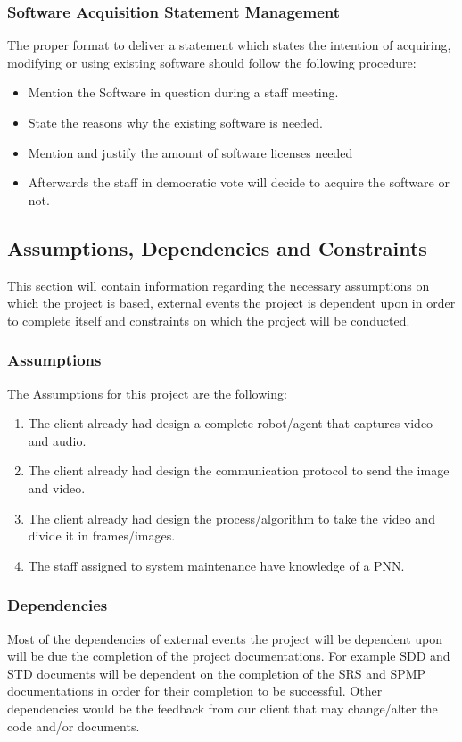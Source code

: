\documentclass[12pt]{article}
\begin{document}
\subsubsection{Software Acquisition Statement Management}
The proper format to deliver a statement which states the intention of acquiring, modifying or using existing software should follow the following procedure:

\begin{itemize}
  \item	Mention the Software in question during a staff meeting.
  \item State the reasons why the existing software is needed.
  \item Mention and justify the amount of software licenses needed
  \item Afterwards the staff in democratic vote will decide to acquire the software or not.
\end{itemize}

\subsection{Assumptions, Dependencies and Constraints}
This section will contain information regarding the necessary assumptions on which the project is based, external events the project is dependent upon in order to complete itself and constraints on which the project will be conducted.

\subsubsection{Assumptions}
The Assumptions for this project are the following:

\begin{enumerate}
  \item The client already had design a complete robot/agent that captures video and audio.
  \item The client already had design the communication protocol to send the image and video.
  \item The client already had design the process/algorithm to take the video and divide it in frames/images.
  \item The staff assigned to system maintenance have knowledge of a PNN.
\end{enumerate}
\subsubsection{Dependencies}
Most of the dependencies of external events the project will be dependent upon will be due the completion of the project documentations. For example SDD and STD documents will be dependent on the completion of the SRS and SPMP documentations in order for their completion to be successful. Other dependencies would be the feedback from our client that may change/alter the code and/or documents.
\end{document}
